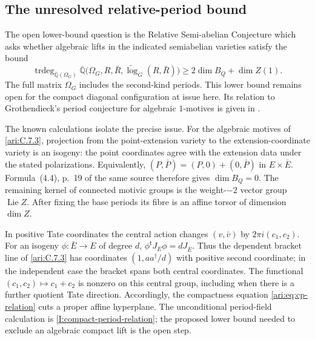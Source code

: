 \subsection{The unresolved relative-period bound}
\hypertarget{tag-001D}{}\label{ari:C.7.4}

The open lower-bound question is the Relative Semi-abelian Conjecture
\cite[Conjecture~4.7, arXiv v2, p.~18]{bertolin2022} which asks whether algebraic lifts in the indicated semiabelian
varieties satisfy the bound
\[
 \operatorname{trdeg}_{\overline{\mathbb Q}(\Omega_G)}
 \overline{\mathbb Q}\bigl(\Omega_G,R,\bar R,
                   \widetilde{\log}_G(R,\bar R)\bigr)
 \geq 2\dim B_Q+\dim Z(1).
\]
The full matrix $\Omega_G$ includes the second-kind periods.
This lower bound remains open for the compact diagonal
configuration at issue here. Its relation to Grothendieck's
period conjecture for algebraic $1$-motives is given in
\cite[Proposition~4.12, arXiv v2, pp.~19--20]{bertolin2022}.

The known calculations isolate the precise issue.
For the algebraic motives of \cref{ari:C.7.3}, projection
from the point-extension variety to the extension-coordinate
variety is an isogeny: the point coordinates agree with the
extension data under the stated polarizations.
Equivalently, $(P,\bar P)=(P,0)+(0,\bar P)$ in
$E\times\bar E$. Formula~(4.4), p.~19 of the same source
therefore gives $\dim B_Q=0$.
The remaining kernel of connected motivic groups is the
weight-$-2$ vector group $\operatorname{Lie}Z$.
After fixing the base periods its fibre is an affine torsor
of dimension $\dim Z$.

In positive Tate coordinates the central action changes
$(v,\bar v)$ by $2\pi i(c_1,c_2)$.
For an isogeny $\phi:\bar E\to E$ of degree $d$,
$\phi^{\mathsf t}J_E\phi=dJ_{\bar E}$.
Thus the dependent bracket line of \cref{ari:C.7.3}
has coordinates $(1,aa^\dagger/d)$ with positive second
coordinate; in the independent case the bracket spans both
central coordinates.
The functional $(c_1,c_2)\mapsto c_1+c_2$ is nonzero
on this central group, including when there is a further
quotient Tate direction.
Accordingly, the compactness equation
\eqref{ari:eq:cp-relation} cuts a proper affine hyperplane.
The unconditional period-field calculation is
\cref{I:compact-period-relation}; the proposed lower bound
needed to exclude an algebraic compact lift is the open step.

